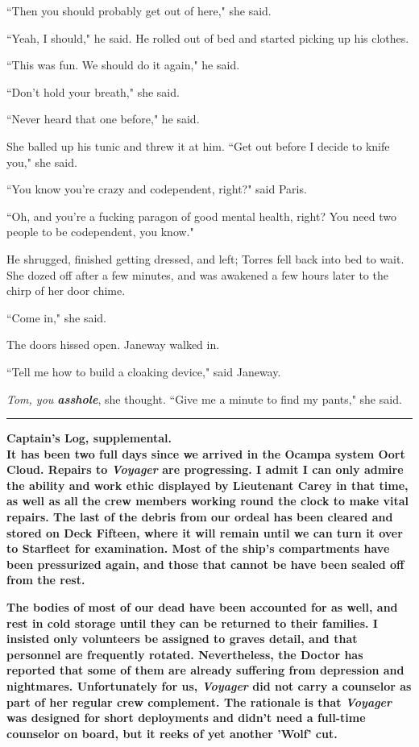 \documentclass[twoside,letterpaper,12pt]{memoir}
\begin{document}
``Then you should probably get out of here," she said. 

``Yeah, I should," he said. He rolled out of bed and started picking up his clothes. 

``This was fun. We should do it again," he said. 

``Don't hold your breath," she said. 

``Never heard that one before," he said. 

She balled up his tunic and threw it at him. ``Get out before I decide to knife you," she said. 

``You know you're crazy and codependent, right?" said Paris. 

``Oh, and you're a fucking paragon of good mental health, right? You need two people to be codependent, you know." 

He shrugged, finished getting dressed, and left; Torres fell back into bed to wait. She dozed off after a few minutes, and was awakened a few hours later to the chirp of her door chime. 

``Come in," she said. 

The doors hissed open. Janeway walked in. 

``Tell me how to build a cloaking device," said Janeway. 

\textit{Tom, you \textbf{asshole}}, she thought. ``Give me a minute to find my pants," she said. 

\begin{center}\rule{3cm}{0.4 pt}\end{center} 

\noindent\textbf{Captain's Log, supplemental.} \\

\textbf{It has been two full days since we arrived in the Ocampa system Oort Cloud. Repairs to \textit{Voyager} are progressing. I admit I can only admire the ability and work ethic displayed by Lieutenant Carey in that time, as well as all the crew members working round the clock to make vital repairs. The last of the debris from our ordeal has been cleared and stored on Deck Fifteen, where it will remain until we can turn it over to Starfleet for examination. Most of the ship's compartments have been pressurized again, and those that cannot be have been sealed off from the rest. }

\textbf{The bodies of most of our dead have been accounted for as well, and rest in cold storage until they can be returned to their families. I insisted only volunteers be assigned to graves detail, and that personnel are frequently rotated. Nevertheless, the Doctor has reported that some of them are already suffering from depression and nightmares. Unfortunately for us, \textit{Voyager} did not carry a counselor as part of her regular crew complement. The rationale is that \textit{Voyager} was designed for short deployments and didn't need a full-time counselor on board, but it reeks of yet another 'Wolf' cut.} 
\end{document}
